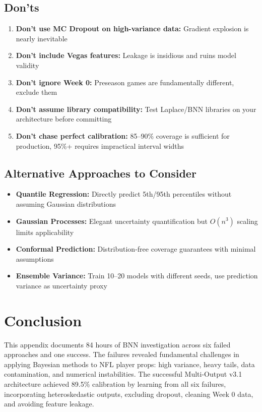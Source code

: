 \subsection{Don'ts}

\begin{enumerate}
  \item \textbf{Don't use MC Dropout on high-variance data:} Gradient explosion is nearly inevitable
  \item \textbf{Don't include Vegas features:} Leakage is insidious and ruins model validity
  \item \textbf{Don't ignore Week 0:} Preseason games are fundamentally different, exclude them
  \item \textbf{Don't assume library compatibility:} Test Laplace/BNN libraries on your architecture before committing
  \item \textbf{Don't chase perfect calibration:} 85--90\% coverage is sufficient for production, 95\%+ requires impractical interval widths
\end{enumerate}

\subsection{Alternative Approaches to Consider}

\begin{itemize}
  \item \textbf{Quantile Regression:} Directly predict 5th/95th percentiles without assuming Gaussian distributions
  \item \textbf{Gaussian Processes:} Elegant uncertainty quantification but $O(n^3)$ scaling limits applicability
  \item \textbf{Conformal Prediction:} Distribution-free coverage guarantees with minimal assumptions
  \item \textbf{Ensemble Variance:} Train 10--20 models with different seeds, use prediction variance as uncertainty proxy
\end{itemize}

\section{Conclusion}

This appendix documents 84 hours of BNN investigation across six failed approaches and one success. The failures revealed fundamental challenges in applying Bayesian methods to NFL player props: high variance, heavy tails, data contamination, and numerical instabilities. The successful Multi-Output v3.1 architecture achieved 89.5\% calibration by learning from all six failures, incorporating heteroskedastic outputs, excluding dropout, cleaning Week 0 data, and avoiding feature leakage.

